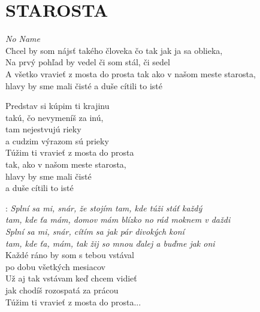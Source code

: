 \section*{\Huge STAROSTA}
\emph{No Name}\\

Chcel by som nájsť takého človeka čo tak jak ja sa oblieka,\\
Na prvý pohľad by vedel či som stál, či sedel\\

A všetko vravieť z mosta do prosta tak ako v našom meste starosta,\\
hlavy by sme mali čisté a duše cítili to isté\\

\vspace{-15pt}\begin{multicols}{2}
Predstav si kúpim ti krajinu\\
takú, čo nevymeníš za inú,\\
tam nejestvujú rieky\\
a cudzim výrazom sú prieky\\

Túžim ti vravieť z mosta do prosta\\
tak, ako v našom meste starosta,\\
hlavy by sme mali čisté\\
a duše cítili to isté\\

\end{multicols}

\textregistered: \emph{Splní sa mi, snár, že stojím tam, kde túži stáť každý\\
tam, kde ťa mám, domov mám blízko no rád moknem v daždi}\\

\emph{Splní sa mi, snár, cítím sa jak pár divokých koní\\
tam, kde ťa, mám, tak žij so mnou ďalej a buďme jak oni}\\

Každé ráno by som s tebou vstával\\
po dobu všetkých mesiacov\\
Už aj tak vstávam keď chcem vidieť\\
jak chodíš rozospatá za prácou\\
Túžim ti vravieť z mosta do prosta...\\

\textregistered

\newpage
